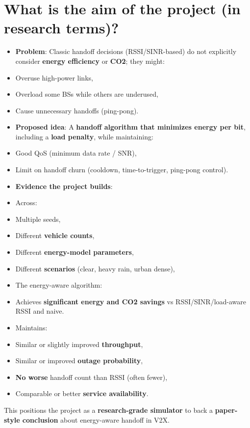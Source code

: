 \documentclass[conference]{IEEEtran}
\begin{document}
\section{What is the aim of the project (in research terms)?}
\begin{itemize}
\item \textbf{Problem}: Classic handoff decisions (RSSI/SINR-based) do not explicitly consider \textbf{energy efficiency} or \textbf{CO2}; they might:
\item Overuse high-power links,
\item Overload some BSs while others are underused,
\item Cause unnecessary handoffs (ping-pong).
\item \textbf{Proposed idea}: A \textbf{handoff algorithm that minimizes energy per bit}, including a \textbf{load penalty}, while maintaining:
\item Good QoS (minimum data rate / SNR),
\item Limit on handoff churn (cooldown, time-to-trigger, ping-pong control).
\item \textbf{Evidence the project builds}:
\item Across:
\item Multiple seeds,
\item Different \textbf{vehicle counts},
\item Different \textbf{energy-model parameters},
\item Different \textbf{scenarios} (clear, heavy rain, urban dense),
\item The energy-aware algorithm:
\item Achieves \textbf{significant energy and CO2 savings} vs RSSI/SINR/load-aware RSSI and naive.
\item Maintains:
\item Similar or slightly improved \textbf{throughput},
\item Similar or improved \textbf{outage probability},
\item \textbf{No worse} handoff count than RSSI (often fewer),
\item Comparable or better \textbf{service availability}.
\end{itemize}

This positions the project as a \textbf{research-grade simulator} to back a \textbf{paper-style conclusion} about energy-aware handoff in V2X.
\end{document}
